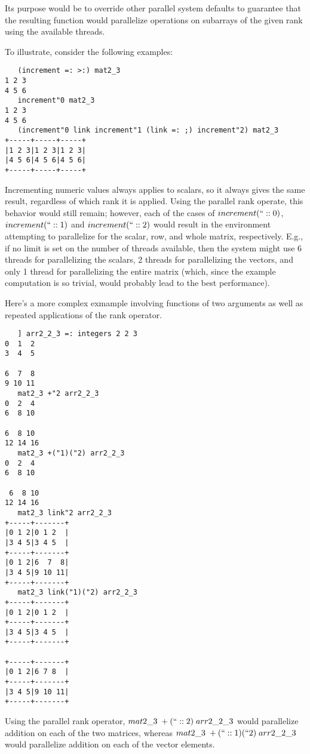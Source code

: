 Its purpose would be to override other parallel system defaults 
to guarantee that the resulting function would parallelize operations on subarrays of the given rank 
using the available threads.

To illustrate, consider the following examples:

\begin{verbatim}
   (increment =: >:) mat2_3
1 2 3
4 5 6
   increment"0 mat2_3
1 2 3
4 5 6
   (increment"0 link increment"1 (link =: ;) increment"2) mat2_3
+-----+-----+-----+
|1 2 3|1 2 3|1 2 3|
|4 5 6|4 5 6|4 5 6|
+-----+-----+-----+
\end{verbatim}

Incrementing numeric values always applies to scalars, so it always gives the same result, 
regardless of which rank it is applied. 
Using the parallel rank operate, this behavior would still remain; 
however, each of the cases of $increment(``::0)$, $increment(``::1)$ and $increment(``::2)$ 
would result in the environment attempting to parallelize for the scalar, row, and whole matrix, respectively.
E.g., if no limit is set on the number of threads available, 
then the system might use 6 threads for parallelizing the scalars, 
2 threads for parallelizing the vectors, 
and only 1 thread for parallelizing the entire matrix 
(which, since the example computation is so trivial, would probably lead to the best performance).

Here's a more complex exmample involving functions of two arguments 
as well as repeated applications of the rank operator.

\begin{verbatim}
   ] arr2_2_3 =: integers 2 2 3
0  1  2
3  4  5

6  7  8
9 10 11
   mat2_3 +"2 arr2_2_3
0  2  4
6  8 10

6  8 10
12 14 16
   mat2_3 +("1)("2) arr2_2_3
0  2  4
6  8 10

 6  8 10
12 14 16
   mat2_3 link"2 arr2_2_3
+-----+-------+
|0 1 2|0 1 2  |
|3 4 5|3 4 5  |
+-----+-------+
|0 1 2|6  7  8|
|3 4 5|9 10 11|
+-----+-------+
   mat2_3 link("1)("2) arr2_2_3
+-----+-------+
|0 1 2|0 1 2  |
+-----+-------+
|3 4 5|3 4 5  |
+-----+-------+

+-----+-------+
|0 1 2|6 7 8  |
+-----+-------+
|3 4 5|9 10 11|
+-----+-------+
\end{verbatim}

Using the parallel rank operator, 
$mat2\_3\;+(``::2)\;arr2\_2\_3$ would parallelize addition on each of the two matrices, whereas
$mat2\_3\;+(``::1)(``2)\;arr2\_2\_3$ would parallelize addition on each of the vector elements.

